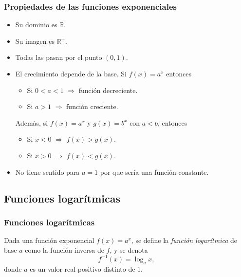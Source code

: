 \begin{frame}
\frametitle{Propiedades de las funciones exponenciales}
\begin{itemize}
\item Su dominio es $\mathbb{R}$.
\item Su imagen es $\mathbb{R}^+$.
\item Todas las pasan por el punto $(0,1)$.
\item El crecimiento depende de la base. Si $f(x)=a^x$ entonces
\begin{itemize}
\item Si $0<a<1$ $\Rightarrow$ función decreciente.
\item Si $a>1$ $\Rightarrow$ función creciente. 
\end{itemize}
Además, si $f(x)=a^x$ y $g(x)=b^x$ con $a<b$, entonces
\begin{itemize}
\item Si $x<0$ $\Rightarrow$ $f(x)>g(x)$.
\item Si $x>0$ $\Rightarrow$ $f(x)<g(x)$.
\end{itemize}

\item No tiene sentido para $a=1$ por que sería una función constante.
\end{itemize}
\end{frame} 



\subsection{Funciones logarítmicas}
\begin{frame}
\frametitle{Funciones logarítmicas}
\begin{definicion}
Dada una función exponencial $f(x)=a^x$, se define la \emph{función logarítmica} de base $a$ como la función inversa de
$f$, y se denota
\[
f^{-1}(x)=\log_a x,
\]
donde $a$ es un valor real positivo distinto de 1.
\end{definicion}
\begin{center}
\scalebox{1}{}
\end{center}
\end{frame} 


